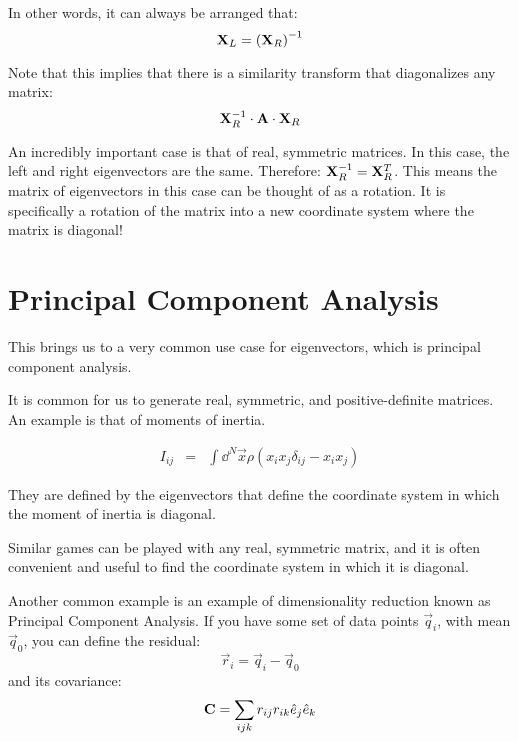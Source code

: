 In other words, it can always be arranged that:
\begin{equation}
{\bf X}_L = \left({\bf X}_R\right)^{-1}
\end{equation}

Note that this implies that there is a similarity transform that
diagonalizes any matrix:
\begin{equation}
{\bf X}_R^{-1} \cdot {\bf A} \cdot {\bf X}_R 
\end{equation}

An incredibly important case is that of real, symmetric matrices. In
this case, the left and right eigenvectors are the same.  Therefore:
${\bf X}_R^{-1} = {\bf X}_R^T$. This means the matrix of eigenvectors
in this case can be thought of as a rotation. It is specifically a
rotation of the matrix into a new coordinate system where the matrix
is diagonal!

\section{Principal Component Analysis}

This brings us to a very common use case for eigenvectors, which is
principal component analysis. 

It is common for us to generate real, symmetric, and positive-definite
matrices.  An example is that of moments of inertia.


\begin{answer}
\begin{eqnarray}
I_{ij} &=& \int \dd^N{\vec{x}} \rho \left( x_i x_j \delta_{ij} - x_i
x_j\right)
\end{eqnarray}
\end{answer}


\begin{answer}
They are defined by the eigenvectors that define the coordinate system
in which the moment of inertia is diagonal.
\end{answer}

Similar games can be played with any real, symmetric matrix, and it is
often convenient and useful to find the coordinate system in which it
is diagonal. 

Another common example is an example of dimensionality reduction known
as Principal Component Analysis. If you have some set of data points
$\vec{q}_i$, with mean $\vec{q}_0$, you can define the residual:
\begin{equation}
\vec{r}_i = \vec{q}_i - \vec{q}_0
\end{equation}
and its covariance:
\begin{equation}
{\bf C} = \sum_{ijk} r_{ij} r_{ik} {\hat e}_j  {\hat e}_k
\end{equation}

